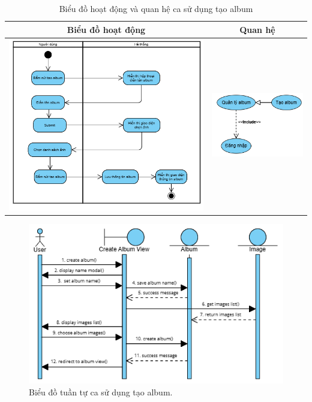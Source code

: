 \vspace{0.8cm}

\noindent 
\begin{table}[H]
\centering
\caption{Biểu đồ hoạt động và quan hệ ca sử dụng tạo album}
\label{tab:create-album-usecase-activity}
\begin{tabular}{| c | c |}
    \hline
    \textbf{Biểu đồ hoạt động} & \textbf{Quan hệ} \\ 
    \hline
    \includegraphics[width=0.6\linewidth]{figures/c3/3-3-7-activity-diagram.png} 
    &  
    \includegraphics[width=0.35\linewidth]{figures/c3/3-3-7-relationship.png} \\ 
    \hline
\end{tabular}
\end{table}

\noindent
\begin{figure}[H]
    \centering  
    \includegraphics[width=1\textwidth]{figures/c3/3-3-7-sequence-diagram.png}
    \caption{Biểu đồ tuần tự ca sử dụng tạo album.}
    \label{fig:3-3-7-sequence-diagram}
\end{figure}
